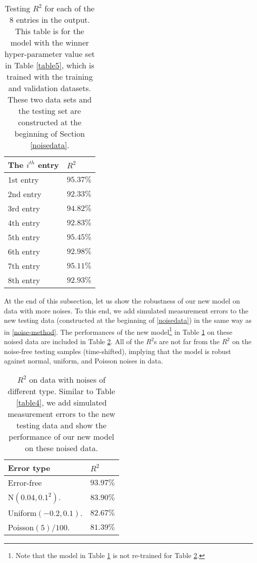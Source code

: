 \documentclass[thmsa,onecolumn,12pt]{article}%
\begin{document}
\begin{table}[!htb]%
\caption{Testing $R^2$ for each of the 8 entries in the output. This table is for the model with the winner hyper-parameter value set in Table \ref{table5}, which is trained with the training and validation datasets. These two data sets and the testing set are constructed at the beginning of Section \ref{noisedata}.}
\label{table7}
\centering%
\begin{tabular}{ p{5cm}  p{5cm}  }
\toprule%
The $i^{th}$ entry & $R^2$  \\
\toprule
1st entry & $95.37\%$\\
2nd entry & $92.33\%$\\
3rd entry & $94.82\%$\\
4th entry & $92.83\%$\\
5th entry & $95.45\%$\\
6th entry & $92.98\%$\\
7th entry & $95.11\%$\\
8th entry & $92.93\%$\\
\bottomrule
\end{tabular}
\end{table}



At the end of this subsection, let us show the robustness of our new model on data with more noises. To this end, we add simulated measurement errors to the new testing data (constructed at the beginning of \ref{noisedata}) in the same way as in \ref{noise-method}. The performances of the new model\footnote{Note that the model in Table \ref{table7} is not re-trained for Table \ref{table8}.} in Table \ref{table7} on these noised data are included in Table \ref{table8}. All of the $R^2$s are not far from the $R^2$ on the noise-free testing samples (time-shifted), implying that the model is robust against normal, uniform, and Poisson noises in data.

\begin{table}[!htb]%
\caption{$R^2$ on data with noises of different type. Similar to Table \ref{table4}, we add simulated measurement errors to the new testing data and show the performance of our new  model on these noised data.}
\label{table8}
\centering%
\begin{tabular}{ p{5cm}  p{3cm}  }
\toprule%
Error type & $R^2$  \\
\toprule
Error-free &$93.97\%$ \\
N$(0.04, 0.1^2)$. &$83.90\%$ \\
Uniform$(-0.2, 0.1)$. & $82.67\%$\\
Poisson$(5)/100$. & $81.39\%$\\
\bottomrule
\end{tabular}
\end{table}
\end{document}
